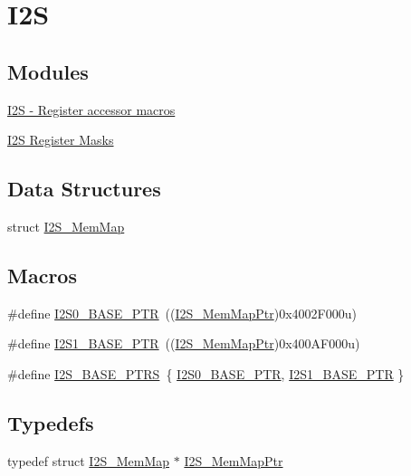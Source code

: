\hypertarget{group___i2_s___peripheral}{}\section{I2\+S}
\label{group___i2_s___peripheral}
\subsection*{Modules}
\begin{DoxyCompactItemize}
\item 
\hyperlink{group___i2_s___register___accessor___macros}{I2\+S -\/ Register accessor macros}
\item 
\hyperlink{group___i2_s___register___masks}{I2\+S Register Masks}
\end{DoxyCompactItemize}
\subsection*{Data Structures}
\begin{DoxyCompactItemize}
\item 
struct \hyperlink{struct_i2_s___mem_map}{I2\+S\+\_\+\+Mem\+Map}
\end{DoxyCompactItemize}
\subsection*{Macros}
\begin{DoxyCompactItemize}
\item 
\#define \hyperlink{group___i2_s___peripheral_ga2eac5d85244610150239927c71b2e147}{I2\+S0\+\_\+\+B\+A\+S\+E\+\_\+\+P\+T\+R}~((\hyperlink{group___i2_s___peripheral_ga13144089ddabdfb4b30ae97b2ac9c859}{I2\+S\+\_\+\+Mem\+Map\+Ptr})0x4002\+F000u)
\item 
\#define \hyperlink{group___i2_s___peripheral_ga1a9b2077128eb723b292b14fea26b83f}{I2\+S1\+\_\+\+B\+A\+S\+E\+\_\+\+P\+T\+R}~((\hyperlink{group___i2_s___peripheral_ga13144089ddabdfb4b30ae97b2ac9c859}{I2\+S\+\_\+\+Mem\+Map\+Ptr})0x400\+A\+F000u)
\item 
\#define \hyperlink{group___i2_s___peripheral_gad4496321b78d6de21d7434afb80480b5}{I2\+S\+\_\+\+B\+A\+S\+E\+\_\+\+P\+T\+R\+S}~\{ \hyperlink{group___i2_s___peripheral_ga2eac5d85244610150239927c71b2e147}{I2\+S0\+\_\+\+B\+A\+S\+E\+\_\+\+P\+T\+R}, \hyperlink{group___i2_s___peripheral_ga1a9b2077128eb723b292b14fea26b83f}{I2\+S1\+\_\+\+B\+A\+S\+E\+\_\+\+P\+T\+R} \}
\end{DoxyCompactItemize}
\subsection*{Typedefs}
\begin{DoxyCompactItemize}
\item 
typedef struct \hyperlink{struct_i2_s___mem_map}{I2\+S\+\_\+\+Mem\+Map} $\ast$ \hyperlink{group___i2_s___peripheral_ga13144089ddabdfb4b30ae97b2ac9c859}{I2\+S\+\_\+\+Mem\+Map\+Ptr}
\end{DoxyCompactItemize}


